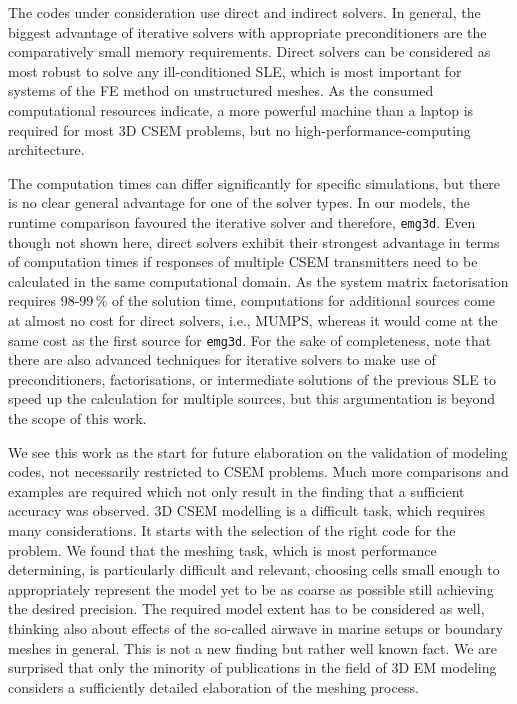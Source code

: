 \documentclass[
    paper,
  ]{geophysics}
\newcommand{\emg}[2]{\texttt{emg#1#2}\xspace}
\begin{document}
The codes under consideration use direct and indirect solvers. In general, the
biggest advantage of iterative solvers with appropriate preconditioners are the
comparatively small memory requirements. Direct solvers can be considered as
most robust to solve any ill-conditioned SLE, which is most important for
systems of the FE method on unstructured meshes. As the consumed computational
resources indicate, a more powerful machine than a laptop is required for most
3D CSEM problems, but no high-performance-computing architecture.

The computation times can differ significantly for specific simulations, but
there is no clear general advantage for one of the solver types. In our models,
the runtime comparison favoured the iterative solver and therefore, \emg3d.
Even though not shown here, direct solvers exhibit their strongest advantage in
terms of computation times if responses of multiple CSEM transmitters need to
be calculated in the same computational domain. As the system matrix
factorisation requires 98-99\,\% of the solution time, computations for
additional sources come at almost no cost for direct solvers, i.e., MUMPS,
whereas it would come at the same cost as the first source for \emg3d. For the
sake of completeness, note that there are also advanced techniques for
iterative solvers to make use of preconditioners, factorisations, or
intermediate solutions of the previous SLE to speed up the calculation for
multiple sources, but this argumentation is beyond the scope of this work.

We see this work as the start for future elaboration on the validation of
modeling codes, not necessarily restricted to CSEM problems. Much more
comparisons and examples are required which not only result in the finding that
a sufficient accuracy was observed. 3D CSEM modelling is a difficult task,
which requires many considerations. It starts with the selection of the right
code for the problem. We found that the meshing task, which is most performance
determining, is particularly difficult and relevant, choosing cells small
enough to appropriately represent the model yet to be as coarse as possible
still achieving the desired precision. The required model extent has to be
considered as well, thinking also about effects of the so-called airwave in
marine setups or boundary meshes in general. This is not a new finding but
rather well known fact. We are surprised that only the minority of publications
in the field of 3D EM modeling considers a sufficiently detailed elaboration of
the meshing process.
\end{document}
